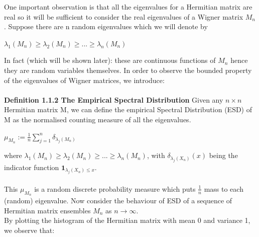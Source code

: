 \documentclass{article}
\begin{document}
 One important observation is that all the eigenvalues for a Hermitian matrix are real so it will be sufficient to consider the real eigenvalues of a Wigner matrix $M_n$. Suppose there are n random eigenvalues which we will denote by 
\begin{center}
    $\lambda_1(M_n) \geq \lambda_2(M_n) \geq ... \geq \lambda_n(M_n)$
\end{center}
 In fact (which will be shown later): these are continuous functions of $M_n$ hence they are random variables themselves. In order to observe the bounded property of the eigenvalues of Wigner matrices, we introduce:\\
 \\
\textbf{Definition 1.1.2 The Empirical Spectral Distribution}
 Given any $n\times n$ Hermitian matrix M, we can define the empirical Spectral Distribution (ESD) of M as the normalised counting measure of all the eigenvalues.
 \begin{center}
     $\mu_{M_n} := \frac{1}{n} \sum\limits_{j = 1}^{n} \delta_{\lambda_j(M_n)}$
 \end{center}
where $\lambda_1(M_n) \geq \lambda_2(M_n) \geq ... \geq \lambda_n(M_n)$, with $\delta_{\lambda_j(X_n)}(x)$ being the indicator function $\textbf{1}_{\lambda_j(X_n) \leq x}$.\\
 \\
This $\mu_{M_n}$ is a random discrete probability measure which puts $\frac{1}{n}$ mass to each (random) eigenvalue. Now consider the behaviour of ESD of a sequence of Hermitian matrix ensembles $M_n$ as $n\rightarrow \infty$. \\
By plotting the histogram of the Hermitian matrix with mean 0 and variance 1, we observe that: \\
\end{document}
